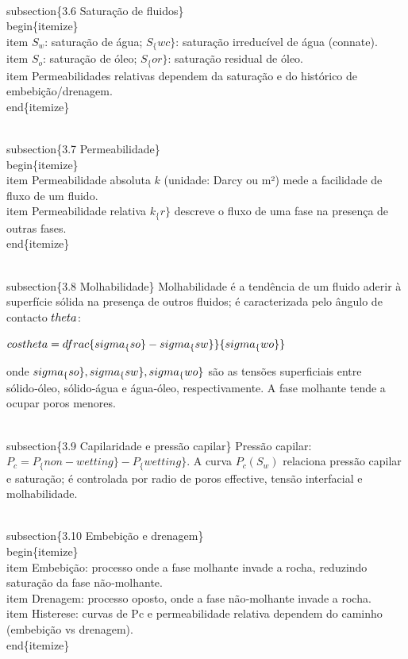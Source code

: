 \documentclass[11pt,a4paper]{article}
\begin{document}
\begin{enumerate}
{\\subsection\{3.6 Saturação de fluidos\}
\\begin\{itemize\}
\\item $S_w$: saturação de água; $S_\{wc\}$: saturação irreducível de água (connate). 
\\item $S_o$: saturação de óleo; $S_\{or\}$: saturação residual de óleo.
\\item Permeabilidades relativas dependem da saturação e do histórico de embebição/drenagem.
\\end\{itemize\}

\\subsection\{3.7 Permeabilidade\}
\\begin\{itemize\}
\\item Permeabilidade absoluta $k$ (unidade: Darcy ou m²) mede a facilidade de fluxo de um fluido.
\\item Permeabilidade relativa $k_\{r\}$ descreve o fluxo de uma fase na presença de outras fases.
\\end\{itemize\}

\\subsection\{3.8 Molhabilidade\}
Molhabilidade é a tendência de um fluido aderir à superfície sólida na presença de outros fluidos; é caracterizada pelo ângulo de contacto $\\theta$:

$\\cos\\theta = \\dfrac\{\\sigma_\{so\}-\\sigma_\{sw\}\}\{\\sigma_\{wo\}\}$

onde $\\sigma_\{so\},\\sigma_\{sw\},\\sigma_\{wo\}$ são as tensões superficiais entre sólido‑óleo, sólido‑água e água‑óleo, respectivamente. A fase molhante tende a ocupar poros menores.

\\subsection\{3.9 Capilaridade e pressão capilar\}
Pressão capilar: $P_c = P_\{non-wetting\} - P_\{wetting\}$. A curva $P_c(S_w)$ relaciona pressão capilar e saturação; é controlada por radio de poros effective, tensão interfacial e molhabilidade.

\\subsection\{3.10 Embebição e drenagem\}
\\begin\{itemize\}
\\item Embebição: processo onde a fase molhante invade a rocha, reduzindo saturação da fase não‑molhante.
\\item Drenagem: processo oposto, onde a fase não‑molhante invade a rocha.
\\item Histerese: curvas de Pc e permeabilidade relativa dependem do caminho (embebição vs drenagem).
\\end\{itemize\}

}
\end{enumerate}
\end{document}
